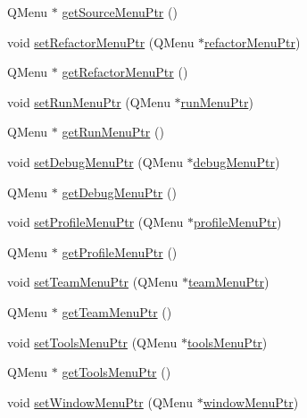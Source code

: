 \begin{DoxyCompactItemize}
\item 
Q\-Menu $\ast$ \hyperlink{class_master_gui_ab3b214293b67475e58c899a0683c4b52}{get\-Source\-Menu\-Ptr} ()
\item 
void \hyperlink{class_master_gui_a63c4e2fc02d8101c5d2113783dc86449}{set\-Refactor\-Menu\-Ptr} (Q\-Menu $\ast$\hyperlink{class_master_gui_a44e789008fcc276a7a4294beb98d02c7}{refactor\-Menu\-Ptr})
\item 
Q\-Menu $\ast$ \hyperlink{class_master_gui_a53f1c9667111f13cf966c6eb9d0c6ebf}{get\-Refactor\-Menu\-Ptr} ()
\item 
void \hyperlink{class_master_gui_a9d5a2185276d6a2a7a62227b55e9c8be}{set\-Run\-Menu\-Ptr} (Q\-Menu $\ast$\hyperlink{class_master_gui_ae5b13b338972e99f29e623d258088b07}{run\-Menu\-Ptr})
\item 
Q\-Menu $\ast$ \hyperlink{class_master_gui_a1f42aebf18ac8c07ffcd057bd5bbe22b}{get\-Run\-Menu\-Ptr} ()
\item 
void \hyperlink{class_master_gui_ae43df54970c7b84ed577ac04d593e6f9}{set\-Debug\-Menu\-Ptr} (Q\-Menu $\ast$\hyperlink{class_master_gui_ac1efdb45cdde47584625a8026166c316}{debug\-Menu\-Ptr})
\item 
Q\-Menu $\ast$ \hyperlink{class_master_gui_af9af9881ddfbae0aa41c0a7c4095ac21}{get\-Debug\-Menu\-Ptr} ()
\item 
void \hyperlink{class_master_gui_ae4baf92ceb9abc180d12d133199780cd}{set\-Profile\-Menu\-Ptr} (Q\-Menu $\ast$\hyperlink{class_master_gui_a9c0ef6beee1cb9afcfff786bc4c6bd06}{profile\-Menu\-Ptr})
\item 
Q\-Menu $\ast$ \hyperlink{class_master_gui_a5d529e740085f8db54937ee0c50a40b3}{get\-Profile\-Menu\-Ptr} ()
\item 
void \hyperlink{class_master_gui_a06fc56181b6ae4854f3c51172d5672fb}{set\-Team\-Menu\-Ptr} (Q\-Menu $\ast$\hyperlink{class_master_gui_ad1d5b1e487d4695bab91ab0db856d795}{team\-Menu\-Ptr})
\item 
Q\-Menu $\ast$ \hyperlink{class_master_gui_ac65ef2f0b70bf6edf23fe7dfba0c8d94}{get\-Team\-Menu\-Ptr} ()
\item 
void \hyperlink{class_master_gui_a3361c70cc3726e7f91aaf856ab1df816}{set\-Tools\-Menu\-Ptr} (Q\-Menu $\ast$\hyperlink{class_master_gui_ab751e75ffdf91f5b90b4c2900975f308}{tools\-Menu\-Ptr})
\item 
Q\-Menu $\ast$ \hyperlink{class_master_gui_a8086c7b6829b3bd0cf3eccad2e608f02}{get\-Tools\-Menu\-Ptr} ()
\item 
void \hyperlink{class_master_gui_aea25ff33b56b0111863b5b7af3513a59}{set\-Window\-Menu\-Ptr} (Q\-Menu $\ast$\hyperlink{class_master_gui_ae33b742ac5529096317c8096984ffef1}{window\-Menu\-Ptr})

\end{DoxyCompactItemize}
